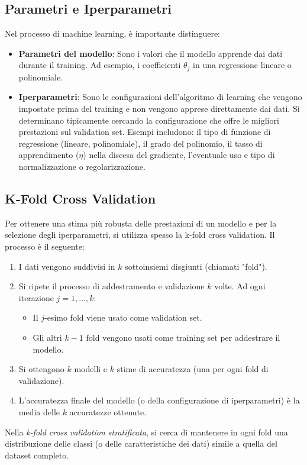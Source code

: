 \documentclass{article}
\begin{document}
\subsection{Parametri e Iperparametri}
Nel processo di machine learning, è importante distinguere:
\begin{itemize}
    \item \textbf{Parametri del modello}: Sono i valori che il modello apprende dai dati durante il training. Ad esempio, i coefficienti $\theta_j$ in una regressione lineare o polinomiale.
    \item \textbf{Iperparametri}: Sono le configurazioni dell'algoritmo di learning che vengono impostate prima del training e non vengono apprese direttamente dai dati. Si determinano tipicamente cercando la configurazione che offre le migliori prestazioni sul validation set. Esempi includono: il tipo di funzione di regressione (lineare, polinomiale), il grado del polinomio, il tasso di apprendimento ($\eta$) nella discesa del gradiente, l'eventuale uso e tipo di normalizzazione o regolarizzazione.
\end{itemize}

\subsection{K-Fold Cross Validation}
Per ottenere una stima più robusta delle prestazioni di un modello e per la selezione degli iperparametri, si utilizza spesso la k-fold cross validation.
Il processo è il seguente:
\begin{enumerate}
    \item I dati vengono suddivisi in $k$ sottoinsiemi disgiunti (chiamati "fold").
    \item Si ripete il processo di addestramento e validazione $k$ volte. Ad ogni iterazione $j=1, \dots, k$:
          \begin{itemize}
              \item Il $j$-esimo fold viene usato come validation set.
              \item Gli altri $k-1$ fold vengono usati come training set per addestrare il modello.
          \end{itemize}
    \item Si ottengono $k$ modelli e $k$ stime di accuratezza (una per ogni fold di validazione).
    \item L'accuratezza finale del modello (o della configurazione di iperparametri) è la media delle $k$ accuratezze ottenute.
\end{enumerate}
Nella \textit{k-fold cross validation stratificata}, si cerca di mantenere in ogni fold una distribuzione delle classi (o delle caratteristiche dei dati) simile a quella del dataset completo.
\end{document}
